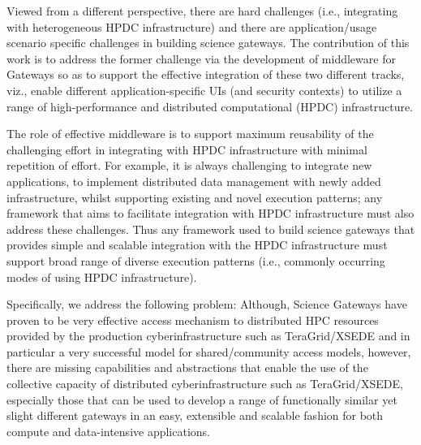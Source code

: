 \documentclass[]{svjour3}
\begin{document}
Viewed from a different perspective, there are hard challenges (i.e.,
integrating with heterogeneous HPDC infrastructure) and there are
application/usage scenario specific challenges in building science gateways. The
contribution of this work is to address the former challenge via the
development of middleware for Gateways so as to support the effective
integration of these two different tracks, viz., enable different
application-specific UIs (and security contexts) to utilize a range of
high-performance and distributed computational (HPDC) infrastructure.

The role of effective middleware is to support maximum reusability of
the challenging effort in integrating with HPDC infrastructure with
minimal repetition of effort.  For example, it is always challenging
to integrate new applications, to implement distributed data
management with newly added infrastructure, whilst supporting existing
and novel execution patterns; any framework that aims to facilitate
integration with HPDC infrastructure must also address these
challenges.  Thus any framework used to build science gateways that
provides simple and scalable integration with the HPDC infrastructure
must support broad range of diverse execution patterns (i.e., commonly
occurring modes of using HPDC infrastructure).

Specifically, we address the following problem: Although, Science
Gateways have proven to be very effective access mechanism to
distributed HPC resources provided by the production
cyberinfrastructure such as TeraGrid/XSEDE and in particular a very
successful model for shared/community access models, however, there
are missing capabilities and abstractions that enable the use of the
collective capacity of distributed cyberinfrastructure such as
TeraGrid/XSEDE, especially those that can be used to develop a range
of functionally similar yet slight different gateways in an easy,
extensible and scalable fashion for both compute and data-intensive
applications.



\end{document}
